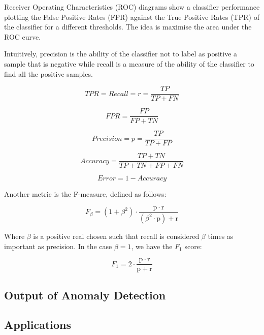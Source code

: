 Receiver Operating Characteristics (ROC) diagrams show a classifier performance plotting the False Positive Rates (FPR) against the True Positive Rates (TPR) of the classifier for a different thresholds. The idea is maximise the area under the ROC curve.

Intuitively, precision is the ability of the classifier not to label as positive a sample that is negative while recall is a measure of the ability of the classifier to find all the positive samples. \cite{scikit-learn}


\begin{equation}
	TPR = Recall = r = \frac{TP}{TP+FN}
\end{equation}

\begin{equation}
	FPR = \frac{FP}{FP+TN}
\end{equation}

\begin{equation}
	Precision = p = \frac{TP}{TP+FP}
\end{equation}

\begin{equation}
	Accuracy = \frac{TP+TN}{TP+TN+FP+FN}
\end{equation}

\begin{equation}
	Error = 1 - Accuracy
\end{equation}

Another metric is the F-measure, defined as follows:

\begin{equation}
	F_\beta = (1 + \beta^2) \cdot \frac{\mathrm{p} \cdot \mathrm{r}}{(\beta^2 \cdot \mathrm{p}) + \mathrm{r}}
\end{equation}

Where $\beta$ is a positive real chosen such that recall is considered $\beta$ times as important as precision. In the case $\beta = 1$, we have the $F_1$ score:

\begin{equation}
	F_1 = 2 \cdot \frac{\mathrm{p} \cdot \mathrm{r}}{\mathrm{p} + \mathrm{r}}
\end{equation}



\subsection{Output of Anomaly Detection}

\subsection{Applications}


